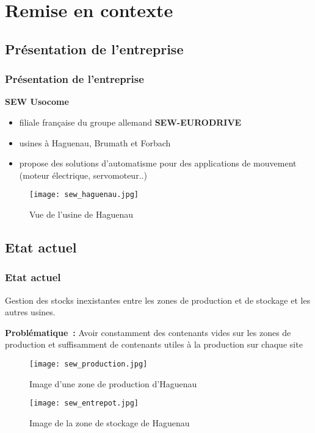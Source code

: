 \section{Remise en contexte}
\subsection{Pr{\'e}sentation de l'entreprise}
\begin{frame}
  \frametitle{Pr{\'e}sentation de l'entreprise}
  \textbf{SEW Usocome}
  \vspace{4ex}

  \begin{minipage}{.5\textwidth}
  \begin{itemize}
  \item filiale fran{\c c}aise du groupe allemand \textbf{SEW-EURODRIVE}
  \item usines {\`a} Haguenau, Brumath et Forbach
  \item propose des solutions d'automatisme pour des applications de
    mouvement (moteur {\'e}lectrique, servomoteur..)
  \end{itemize}
\end{minipage}%
\begin{minipage}{.5\textwidth}
  \begin{figure}
    \centering
    \texttt{[image: sew\_haguenau.jpg]}
    \caption{Vue de l'usine de Haguenau}%
    \label{fig:sew_haguenau}
  \end{figure}
\end{minipage}
\end{frame}
%
\subsection{Etat actuel}
\begin{frame}
  \frametitle{Etat actuel}

  Gestion des stocks inexistantes entre les zones de production et de
  stockage et les autres usines.

  \textbf{Probl{\'e}matique~:} Avoir constamment des contenants vides sur
  les zones de production et suffisamment de contenants utiles {\`a} la
  production sur chaque site

  \begin{minipage}{.5\textwidth}
    \begin{figure}
      \centering
      \texttt{[image: sew\_production.jpg]}
      \caption{Image d'une zone de production d'Haguenau}%
      \label{fig:sew_production}
    \end{figure}
  \end{minipage}%
  \begin{minipage}{.5\textwidth}
    \begin{figure}
      \centering
      \texttt{[image: sew\_entrepot.jpg]}
      \caption{Image de la zone de stockage de Haguenau}%
      \label{fig:sew_entrepot}
    \end{figure}
  \end{minipage}
\end{frame}%
